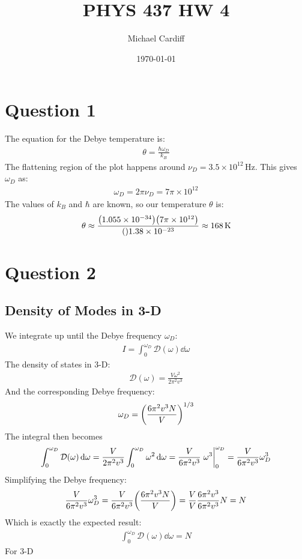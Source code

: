 \documentclass[12pt]{article}
\title{\vspace{-4em}PHYS 437 HW 4}
\author{Michael Cardiff}
\date{\today}
\newcommand{\D}{\mathcal{D}}
\begin{document}
\maketitle
\section*{Question 1}
The equation for the Debye temperature is:
\begin{align*}
  \theta=\frac{\hbar\omega_D}{k_B}
\end{align*}
The flattening region of the plot happens around $\nu_D=3.5\times10^{12}$\,Hz. This gives $\omega_D$ as:
\begin{align*}
  \omega_D=2\pi\nu_D=7\pi\times10^{12}
\end{align*}
The values of $k_B$ and $\hbar$ are known, so our temperature $\theta$ is:
\begin{align*}
  \theta\approx\frac{\qty(1.055\times10^{-34})\qty(7\pi\times10^{12})}
  {\qty1.38\times10^{-23}}\approx168\,\text{K}
\end{align*}
\section*{Question 2}
\subsection*{Density of Modes in 3-D}
We integrate up until the Debye frequency $\omega_D$:
\begin{align*}
  I=\int_0^{\omega_D}\D(\omega)\dd{\omega}
\end{align*}
The density of states in 3-D:
\begin{align*}
  \D(\omega)=\frac{V\omega^2}{2\pi^2v^3}
\end{align*}
And the corresponding Debye frequency:
\begin{align*}
  \omega_D=\qty(\frac{6\pi^2v^3N}{V})^{1/3}
\end{align*}
The integral then becomes
\begin{align*}
  \int_0^{\omega_D}\D(\omega)\dd{\omega}
  =\frac{V}{2\pi^2v^3}\int_0^{\omega_D}\omega^2\dd{\omega}
  =\frac{V}{6\pi^2v^3}\eval{\omega^3}_0^{\omega_D}
  =\frac{V}{6\pi^2v^3}\omega_D^3
\end{align*}
Simplifying the Debye frequency:
\begin{align*}
  \frac{V}{6\pi^2v^3}\omega_D^3=\frac{V}{6\pi^2v^3}\qty(\frac{6\pi^2v^3N}{V})
  =\frac{V}{V}\frac{6\pi^2v^3}{6\pi^2v^3}N=N
\end{align*}
Which is exactly the expected result:
\begin{align*}
  \boxed{\int_0^{\omega_D}\D(\omega)\dd{\omega}=N}
\end{align*}
For 3-D
\end{document}

